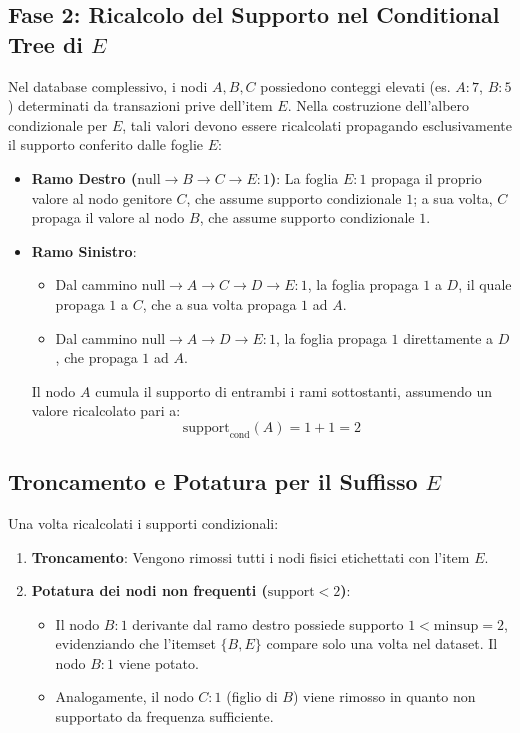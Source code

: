 \subsection{Fase 2: Ricalcolo del Supporto nel Conditional Tree di $E$}
Nel database complessivo, i nodi $A, B, C$ possiedono conteggi elevati (es. $A:7$, $B:5$) determinati da transazioni prive dell'item $E$. Nella costruzione dell'albero condizionale per $E$, tali valori devono essere ricalcolati propagando esclusivamente il supporto conferito dalle foglie $E$:
\begin{itemize}
    \item \textbf{Ramo Destro ($\text{null} \to B \to C \to E:1$)}: La foglia $E:1$ propaga il proprio valore al nodo genitore $C$, che assume supporto condizionale $1$; a sua volta, $C$ propaga il valore al nodo $B$, che assume supporto condizionale $1$.
    \item \textbf{Ramo Sinistro}:
    \begin{itemize}
        \item Dal cammino $\text{null} \to A \to C \to D \to E:1$, la foglia propaga $1$ a $D$, il quale propaga $1$ a $C$, che a sua volta propaga $1$ ad $A$.
        \item Dal cammino $\text{null} \to A \to D \to E:1$, la foglia propaga $1$ direttamente a $D$, che propaga $1$ ad $A$.
    \end{itemize}
    Il nodo $A$ cumula il supporto di entrambi i rami sottostanti, assumendo un valore ricalcolato pari a:
    \begin{equation}
    \text{support}_{\text{cond}}(A) = 1 + 1 = 2
    \end{equation}
\end{itemize}

\FloatBarrier
\subsection{Troncamento e Potatura per il Suffisso $E$}
Una volta ricalcolati i supporti condizionali:
\begin{enumerate}
    \item \textbf{Troncamento}: Vengono rimossi tutti i nodi fisici etichettati con l'item $E$.
    \item \textbf{Potatura dei nodi non frequenti ($\text{support} < 2$)}:
    \begin{itemize}
        \item Il nodo $B:1$ derivante dal ramo destro possiede supporto $1 < \text{minsup} = 2$, evidenziando che l'itemset $\{B, E\}$ compare solo una volta nel dataset. Il nodo $B:1$ viene potato.
        \item Analogamente, il nodo $C:1$ (figlio di $B$) viene rimosso in quanto non supportato da frequenza sufficiente.
    \end{itemize}
\end{enumerate}

